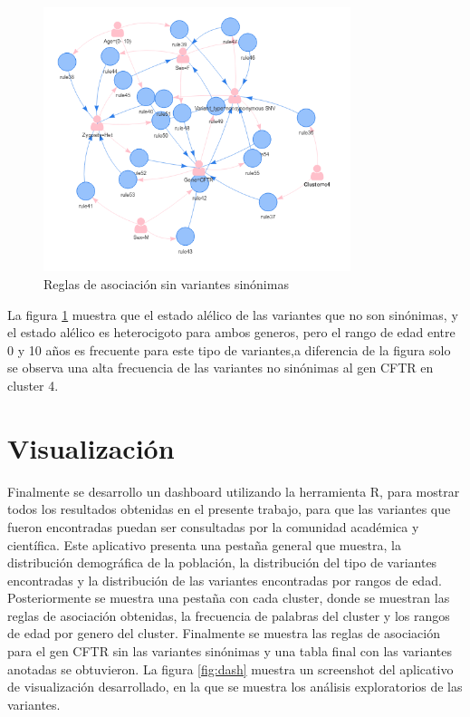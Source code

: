 \begin{figure}[H]
	\centering
	\includegraphics[width=0.8\textwidth]{Kap4/CFTR2}
	\caption{Reglas de asociación sin variantes sinónimas} \label{fig:re6}
\end{figure}

La figura \ref{fig:re6} muestra que el estado alélico de las variantes que no son sinónimas, y el estado alélico es heterocigoto para ambos generos, pero el rango de edad entre 0 y 10 años es frecuente para este tipo de variantes,a diferencia de la figura \label{fig:r6} solo se observa una alta frecuencia de las variantes no sinónimas al gen CFTR en cluster 4.  

\section{Visualización}

Finalmente se desarrollo un dashboard utilizando la herramienta R, para mostrar todos los resultados obtenidas en el presente trabajo, para que las variantes que fueron encontradas puedan ser consultadas por la comunidad académica y científica. Este aplicativo presenta una pestaña general que muestra, la distribución demográfica de la población, la distribución del tipo de variantes encontradas y la distribución de las variantes encontradas por rangos de edad. Posteriormente se muestra una pestaña con cada cluster, donde se muestran las reglas de asociación obtenidas, la frecuencia de palabras del cluster y los rangos de edad por genero del cluster. Finalmente se muestra las reglas de asociación para el gen CFTR sin las variantes sinónimas y una tabla final con las variantes anotadas se obtuvieron. La figura \ref{fig:dash} muestra un screenshot  del aplicativo de visualización desarrollado, en la que se muestra los análisis exploratorios de las variantes.

